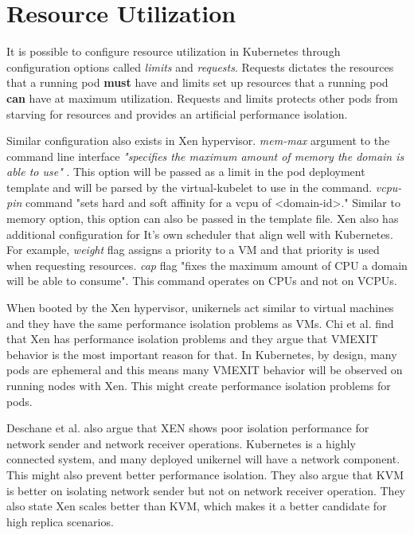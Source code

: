 \section{Resource Utilization}

It is possible to configure resource utilization in Kubernetes through configuration options called \textit{limits} and \textit{requests}. Requests dictates the resources that a running pod \textbf{must} have and limits set up resources that a running pod \textbf{can} have at maximum utilization. Requests and limits protects other pods from starving for resources and provides an artificial performance isolation.

Similar configuration also exists in Xen hypervisor. \textit{mem-max} argument to the command line interface \textit{"specifies the maximum amount of memory the domain is able to use"} \cite{xl-man-page}. This option will be passed as a limit in the pod deployment template and will be parsed by the virtual-kubelet to use in the command. \textit{vcpu-pin} command "sets hard and soft affinity for a vcpu of <domain-id>." \cite{xl-man-page} Similar to memory option, this option can also be passed in the template file. Xen also has additional configuration for It's own scheduler that align well with Kubernetes. For example, \textit{weight} flag assigns a priority to a VM and that priority is used when requesting resources. \textit{cap} flag "fixes the maximum amount of CPU a domain will be able to consume". This command operates on CPUs and not on VCPUs.

When booted by the Xen hypervisor, unikernels act similar to virtual machines and they have the same performance isolation problems as VMs. Chi et al.\cite{performance-isolation} find that Xen has performance isolation problems and they argue that VMEXIT behavior is the most important reason for that. In Kubernetes, by design, many pods are ephemeral and this means many VMEXIT behavior will be observed on running nodes with Xen. This might create performance isolation problems for pods.

Deschane et al. \cite{Deshane} also argue that XEN shows poor isolation performance for network sender and network receiver operations. Kubernetes is a highly connected system, and many deployed unikernel will have a network component. This might also prevent better performance isolation. They also argue that KVM is better on isolating network sender but not on network receiver operation. They also state Xen scales better than KVM, which makes it a better candidate for high replica scenarios.